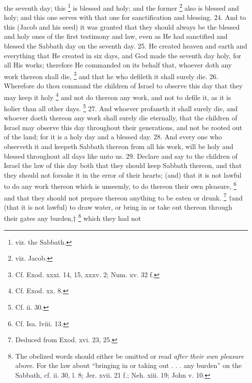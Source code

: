 the seventh day; this \footnote{viz. the Sabbath.} is blessed and holy; and the former \footnote{viz. Jacob.} also is blessed and holy; and this one serves with that one for sanctification and blessing. 24. And to this (Jacob and his seed) it was granted that they should always be the blessed and holy ones of the first testimony and law, even as He had sanctified and blessed the Sabbath day on the seventh day. 25. He created heaven and earth and everything that He created in six days, and God made the seventh day holy, for all His works; therefore He commanded on its behalf that, whoever doth any work thereon shall die, \footnote{Cf. Exod. xxxi. 14, 15, xxxv. 2; Num. xv. 32 f.} and that he who defileth it shall surely die. 26. Wherefore do thou command the children of Israel to observe this day that they may keep it holy \footnote{Cf. Exod. xx. 8.} and not do thereon any work, and not to defile it, as it is holier than all other days. \footnote{Cf. ii. 30.} 27. And whoever profaneth it shall surely die, and whoever doeth thereon any work shall surely die eternally, that the children of Israel may observe this day throughout their generations, and not be rooted out of the land; for it is a holy day and a blessed day. 28. And every one who observeth it and keepeth Sabbath thereon from all his work, will be holy and blessed throughout all days like unto us. 29. Declare and say to the children of Israel the law of this day both that they should keep Sabbath thereon, and that they should not forsake it in the error of their hearts; (and) that it is not lawful to do any work thereon which is unseemly, to do thereon their own pleasure, \footnote{Cf. Isa. lviii. 13.} and that they should not prepare thereon anything to be eaten or drunk. \footnote{Deduced from Exod. xvi. 23, 25.} †and (that it is not lawful) to draw water, or bring in or take out thereon through their gates any burden,† \footnote{The obelized words should either be omitted or read \emph{after their own pleasure} above. For the law about ``bringing in or taking out . . . any burden'' on the Sabbath, cf. ii. 30, l. 8; Jer. xvii. 21 f.; Neh. xiii. 19; John v. 10.} which they had not

